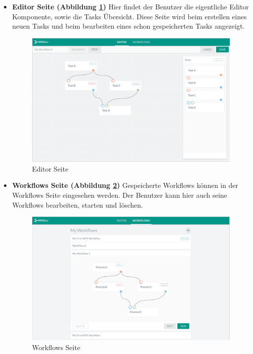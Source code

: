         \begin{itemize}
        
        \item \textbf{Editor Seite (Abbildung \ref{fig:Editor_Page})} \newline
        Hier findet der Benutzer die eigentliche Editor Komponente, sowie die Tasks Übersicht. Diese Seite wird beim erstellen eines neuen Tasks und beim bearbeiten eines schon gespeicherten Tasks angezeigt.
        
        \begin{figure}[h]
        \centering
        \includegraphics[width=\textwidth]{images/ui_page_editor.png}
        \caption{Editor Seite}
        \label{fig:Editor_Page}
        \end{figure}
        
        \item \textbf{Workflows Seite (Abbildung \ref{fig:Workflow_Page})} \newline
        Gespeicherte Workflows können in der Workflows Seite eingesehen werden. Der Benutzer kann hier auch seine Workflows bearbeiten, starten und löschen.
        
        \begin{figure}[h]
        \centering
        \includegraphics[width=\textwidth]{images/ui_page_flow.png}
        \caption{Workflows Seite}
        \label{fig:Workflow_Page}
        \end{figure}
        
        \end{itemize}